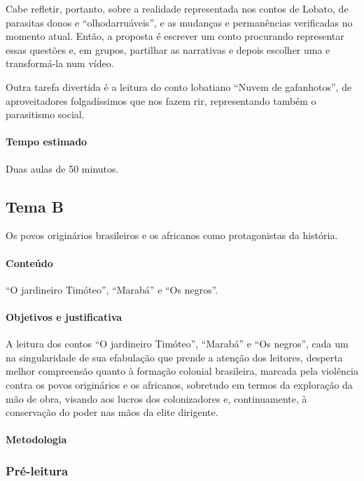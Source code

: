 \documentclass[11pt]{extarticle}
\begin{document}
Cabe refletir, portanto, sobre a realidade representada nos contos de
Lobato, de parasitas donos e ``olhodarruáveis'', e as mudanças e
permanências verificadas no momento atual. Então, a proposta é escrever
um conto procurando representar essas questões e, em grupos, partilhar
as narrativas e depois escolher uma e transformá-la num vídeo.

Outra tarefa divertida é a leitura do conto lobatiano ``Nuvem de
gafanhotos'', de aproveitadores folgadíssimos que nos fazem rir,
representando também o parasitismo social.

\paragraph{Tempo estimado} Duas aulas de 50 minutos.

\subsection{Tema B}

Os povos originários brasileiros e os africanos como protagonistas da história.

\paragraph{Conteúdo} ``O jardineiro Timóteo'', ``Marabá'' e ``Os negros''.

\paragraph{Objetivos e justificativa}
A leitura dos contos ``O jardineiro Timóteo'', ``Marabá'' e ``Os
negros'', cada um na singularidade de sua efabulação que prende a
atenção dos leitores, desperta melhor compreensão quanto à formação
colonial brasileira, marcada pela violência contra os povos originários
e os africanos, sobretudo em termos da exploração da mão de obra,
visando aos lucros dos colonizadores e, continuamente, à conservação do
poder nas mãos da elite dirigente.

\paragraph{Metodologia}

\subsubsection{Pré-leitura}
\end{document}
